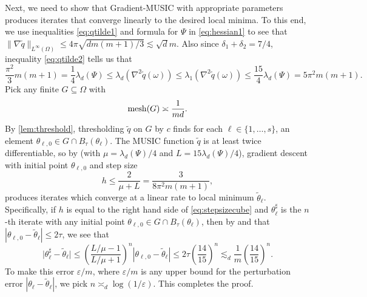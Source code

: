 \documentclass[11pt]{article}
\theoremstyle{definition}
\numberwithin{theorem}{section}
\numberwithin{lemma}{section}
\numberwithin{equation}{section}
\renewcommand{\subset}{\subseteq}
\renewcommand{\tilde}{\widetilde}
\renewcommand{\epsilon}{\varepsilon}
\newcommand{\mesh}{{\rm mesh}}
\newcommand{\domain}{\Omega}
\newcommand{\round}[1]{{\left(#1\right)}}
\numberwithin{equation}{section}
\begin{document}
	Next, we need to show that Gradient-MUSIC with appropriate parameters produces iterates that converge linearly to the desired local minima. To this end, we use inequalities  \eqref{eq:qtilde1} and formula for $\Psi$ in \eqref{eq:hessian1} to see that $\|\nabla \tilde q\|_{L^\infty(\Omega)}
	\leq 4\pi \sqrt{dm(m+1)/3}\lesssim \sqrt d m$. Also since $\delta_1+\delta_2=7/4$, inequality \eqref{eq:qtilde2} tells us that
	\begin{equation} \label{eq:convexitycube}
		\frac{\pi^2}{3} m(m+1)
		=\frac 1 4 \lambda_d(\Psi)
		\leq \lambda_d \round{\nabla^2 \tilde q(\omega)}
		\leq \lambda_1 \round{\nabla^2 \tilde q(\omega)} 
		\leq \frac{15}{4} \lambda_d(\Psi)
		= 5\pi^2 m(m+1). 
	\end{equation}
	Pick any finite $G\subset \domain$ with 
	\begin{equation}\label{eq:meshcube}
		\mesh(G)
		\asymp \frac 1{md}.
	\end{equation}
	By \cref{lem:threshold}, thresholding $\tilde q$ on $G$ by $c$ finds for each $\ell\in \{1,\dots,s\}$, an element $\theta_{\ell,0}\in G\cap B_\tau(\theta_\ell)$. The MUSIC function $\tilde q$ is at least twice differentiable, so by \cite[Theorem 2.1.15]{nesterov2018lectures} (with $\mu=\lambda_d(\Psi)/4$ and $L=15\lambda_d(\Psi)/4$), gradient descent with initial point $\theta_{\ell,0}$ and step size
	\begin{equation}
		\label{eq:stepsizecube}
		h
		\leq \frac 2{\mu+L}
		= \frac{3}{8\pi^2 m(m+1)},
	\end{equation} 
	produces iterates which converge at a linear rate to local minimum $\tilde\theta_\ell$. Specifically, if $h$ is equal to the right hand side of \eqref{eq:stepsizecube} and $\theta^\sharp_\ell$ is the $n$-th iterate with any initial point $\theta_{\ell,0}\in G\cap B_\tau(\theta_\ell)$, then by \cite[Theorem 2.1.15]{nesterov2018lectures} and that $|\theta_{\ell,0}-\tilde \theta_\ell|\leq 2\tau$, we see that 
	\begin{equation}
		\label{eq:numericalerrorcube}
		\big|\theta^\sharp_\ell-\tilde \theta_\ell\big|
		\leq \left(\frac{L/\mu-1}{L/\mu+1}\right)^n |\theta_{\ell,0}-\tilde \theta_\ell| 
		\leq 2 \tau \left(\frac {14}{15}\right)^n
		\lesssim_d \frac 1 m\left(\frac {14}{15} \right)^n. 
	\end{equation}
	To make this error $\epsilon/m$, where $\epsilon/m$ is any upper bound for the perturbation error $|\theta_\ell-\tilde\theta_\ell|$, we pick $n\asymp_d \log(1/\epsilon)$. This completes the proof.
	
\end{document}
